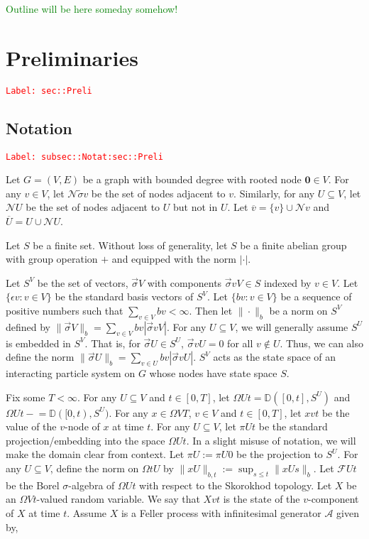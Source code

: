 \documentclass[12pt]{article}
\newcommand{\mb}{\mathbb}
\newcommand{\mc}{\mathcal}
\newcommand{\ov}{\overline}
\newcommand{\ep}{\epsilon}
\newcommand{\tr}{\textcolor{red}}
\newcommand{\tg}{\textcolor{green}}
\newcommand{\labe}[1]{\tr{\texttt{Label: #1}}}
\newcommand{\ind}{\hspace{24pt}}
\newcommand{\defeq}{:=}								%
\newcommand{\cad}{\mb{D}}							%
\renewcommand{\root}{\mathbf{0}}				%
\renewcommand{\v}{v}							%
\renewcommand{\U}{U}							%
\renewcommand{\S}{S}							%
\newcommand{\s}{\sigma}							%
\newcommand{\sv}{\vec{\s}}						%
\renewcommand{\b}{b}							%
\newcommand{\ev}{\ep}							%
\newcommand{\T}{T}								%
\newcommand{\x}{x}								%
\renewcommand{\t}{t}							%
\newcommand{\proj}{\pi}							%
\renewcommand{\tt}{s}							%
\newcommand{\F}{\mc{F}}							%
\newcommand{\X}{X}								%
\newcommand{\IG}{\mc{A}}						%
\newcommand{\neigh}{\mc{N}}						%
\newcommand{\cl}{\ov}							%
\renewcommand{\ss}{\tilde{\s}}					%
\begin{document}
\tg{Outline will be here someday somehow!}


\section{Preliminaries}
\label{sec::Preli}\labe{sec::Preli}

\subsection{Notation}
\label{subsec::Notat:sec::Preli}\labe{subsec::Notat:sec::Preli}

Let \(G = (V,E)\) be a graph with bounded degree with rooted node \(\root \in V\). For any \(\v \in V\), let \(\neigh\ss{\v}\) be the set of nodes adjacent to \(\v\). Similarly, for any \(\U \subseteq  V\), let \(\neigh{\U}\) be the set of nodes adjacent to \(\U\) but not in \(\U\). Let \(\cl{\v} = \{\v\}\cup\neigh{\v}\) and \(\cl{\U} = \U\cup \neigh{\U}\). 

\ind Let \(\S\) be a finite set. Without loss of generality, let \(S\) be a finite abelian group with group operation \(+\) and equipped with the norm \(|\cdot|\). 

\ind Let \(\S^ V\) be the set of vectors, \(\sv{}{ V}\) with components \(\sv{\v}{ V} \in \S\) indexed by \(\v\in  V\). Let \(\{\ev{\v}: \v\in  V\}\) be the standard basis vectors of \(\S^ V\). Let \(\{\b{\v}:\v\in  V\}\) be a sequence of positive numbers such that \(\sum_{\v\in V} \b{\v} < \infty\). Then let \(\|\cdot\|_{\b{}}\) be a norm on \(\S^ V\) defined by \(\|\sv{}{ V}\|_{\b{}} = \sum_{\v\in V} \b{\v}|\sv{\v}{ V}|\). For any \(\U\subseteq  V\), we will generally assume \(\S^\U\) is embedded in \(\S^ V\). That is, for \(\sv{}{\U}\in \S^\U\), \(\sv{\v}{\U} = 0\) for all \(\v\notin\U\). Thus, we can also define the norm \(\|\sv{}{\U}\|_{\b{}} = \sum_{\v\in\U} \b{\v}|\sv{\v}{\U}|\). \(\S^ V\) acts as the state space of an interacting particle system on \(G\) whose nodes have state space \(\S\).

\ind Fix some \(\T < \infty\). For any \(\U\subseteq  V\) and \(\t\in [0,\T]\), let \(\Omega{\U}{\t} = \cad([0,\t],\S^{\U})\) and \(\Omega{\U}{\t-} = \cad([0,\t),\S^\U)\). For any \(\x{}{} \in \Omega{ V}{\T}\), \(\v\in  V\) and  \(\t \in [0,\T]\), let \(\x{\v}{\t}\) be the value of the \(\v\)-node of \(\x{}{}\) at time \(\t\). For any \(\U\subseteq  V\), let \(\proj{\U}{\t}\) be the standard projection/embedding into the space \(\Omega{\U}{\t}\). In a slight misuse of notation, we will make the domain clear from context. Let \(\proj{\U}{} \defeq \proj{\U}{0}\) be the projection to \(\S^\U\). For any \(\U\subseteq  V\), define the norm on \(\Omega{\t}{\U}\) by \(\|\x{\U}{}\|_{\b{},\t} \defeq \sup_{\tt \leq \t} \|\x{\U}{\tt}\|_{\b{}}\). Let \(\F{\U}{\t}\) be the Borel \(\sigma\)-algebra of \(\Omega{\U}{\t}\) with respect to the Skorokhod topology. Let \(\X{}{}\) be an \(\Omega{ V}{\t}\)-valued random variable. We say that \(\X{\v}{\t}\) is the state of the \(\v\)-component of \(\X{}{}\) at time \(\t\). Assume \(\X{}{}\) is a Feller process with infinitesimal generator \(\IG\) given by,
\end{document}
